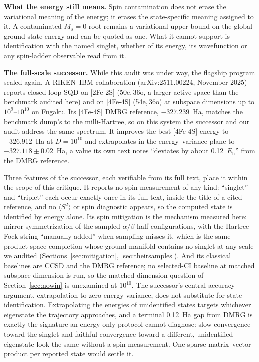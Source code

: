 \documentclass[11pt]{article}
\newcommand{\ssq}{\ensuremath{\langle S^2\rangle}}
\begin{document}
\textbf{What the energy still means.} Spin contamination does not erase the variational meaning of the energy; it erases the state-specific meaning assigned to it. A contaminated $M_s = 0$ root remains a variational upper bound on the global ground-state energy and can be quoted as one. What it cannot support is identification with the named singlet, whether of its energy, its wavefunction or any spin-ladder observable read from it.

\textbf{The full-scale successor.} While this audit was under way, the flagship program scaled again. A RIKEN--IBM collaboration (arXiv:2511.00224, November 2025) reports closed-loop SQD on [2Fe-2S] (50e,\,36o, a larger active space than the benchmark audited here) and on [4Fe-4S] (54e,\,36o) at subspace dimensions up to $10^{9}$--$10^{10}$ on Fugaku. Its [4Fe-4S] DMRG reference, $-327.239$~Ha, matches the benchmark dump's to the milli-Hartree, so on this system the successor and our audit address the same spectrum. It improves the best [4Fe-4S] energy to $-326.912$~Ha at $D=10^{10}$ and extrapolates in the energy--variance plane to $-327.118\pm0.02$~Ha, a value its own text notes ``deviates by about 0.12~$E_{\mathrm{h}}$'' from the DMRG reference.

Three features of the successor, each verifiable from its full text, place it within the scope of this critique. It reports no spin measurement of any kind: ``singlet'' and ``triplet'' each occur exactly once in its full text, inside the title of a cited reference, and no \ssq{} or spin diagnostic appears, so the computed state is identified by energy alone. Its spin mitigation is the mechanism measured here: mirror symmetrization of the sampled $\alpha/\beta$ half-configurations, with the Hartree--Fock string ``manually added'' when sampling misses it, which is the same product-space completion whose ground manifold contains no singlet at any scale we audited (Sections~\ref{sec:mitigation}, \ref{sec:theirsamples}). And its classical baselines are CCSD and the DMRG reference; no selected-CI baseline at matched subspace dimension is run, so the matched-dimension question of Section~\ref{sec:nowin} is unexamined at $10^{10}$. The successor's central accuracy argument, extrapolation to zero energy variance, does not substitute for state identification. Extrapolating the energies of unidentified states targets whichever eigenstate the trajectory approaches, and a terminal 0.12~Ha gap from DMRG is exactly the signature an energy-only protocol cannot diagnose: slow convergence toward the singlet and faithful convergence toward a different, unidentified eigenstate look the same without a spin measurement. One sparse matrix--vector product per reported state would settle it.
\end{document}
